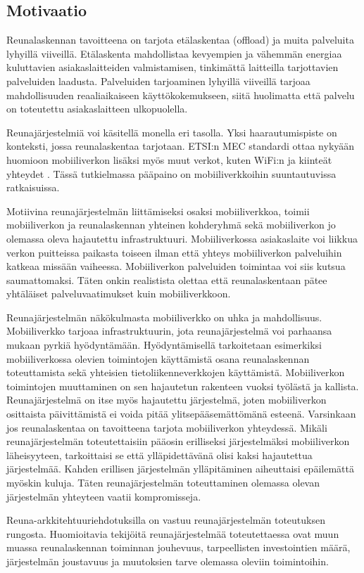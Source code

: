 \subsection{Motivaatio}
Reunalaskennan tavoitteena on tarjota etälaskentaa (offload) ja muita palveluita lyhyillä viiveillä. 
Etälaskenta mahdollistaa kevyempien ja vähemmän energiaa kuluttavien asiakaslaitteiden valmistamisen, tinkimättä laitteilla tarjottavien palveluiden laadusta.
Palveluiden tarjoaminen lyhyillä viiveillä tarjoaa mahdollisuuden reaaliaikaiseen käyttökokemukseen, siitä huolimatta että palvelu on toteutettu asiakaslaitteen ulkopuolella. 

Reunajärjestelmiä voi käsitellä monella eri tasolla. Yksi haarautumispiste on  konteksti, jossa reunalaskentaa tarjotaan. ETSI:n MEC standardi ottaa nykyään huomioon mobiiliverkon lisäksi myös muut verkot, kuten WiFi:n ja kiinteät yhteydet \cite{taleb2017multi}. Tässä tutkielmassa pääpaino on mobiiliverkkoihin suuntautuvissa ratkaisuissa.

Motiivina reunajärjestelmän liittämiseksi osaksi mobiiliverkkoa, toimii mobiiliverkon ja reunalaskennan yhteinen kohderyhmä sekä mobiiliverkon jo olemassa oleva hajautettu infrastruktuuri.
Mobiiliverkossa asiakaslaite voi liikkua verkon puitteissa paikasta toiseen ilman että yhteys mobiiliverkon palveluihin katkeaa missään vaiheessa. Mobiiliverkon palveluiden toimintaa voi siis kutsua saumattomaksi. 
Täten onkin realistista olettaa että reunalaskentaan pätee yhtäläiset palveluvaatimukset kuin mobiiliverkkoon.

Reunajärjestelmän näkökulmasta mobiiliverkko on uhka ja mahdollisuus. Mobiiliverkko tarjoaa infrastruktuurin, jota reunajärjestelmä voi parhaansa mukaan pyrkiä hyödyntämään.
Hyödyntämisellä tarkoitetaan esimerkiksi mobiiliverkossa olevien toimintojen käyttämistä osana reunalaskennan toteuttamista sekä yhteisien tietoliikenneverkkojen käyttämistä.
Mobiiliverkon toimintojen muuttaminen on sen hajautetun rakenteen vuoksi työlästä ja kallista. 
Reunajärjestelmä on itse myös hajautettu järjestelmä, joten mobiiliverkon osittaista päivittämistä ei voida pitää ylitsepääsemättömänä esteenä. Varsinkaan jos reunalaskentaa on tavoitteena tarjota mobiiliverkon yhteydessä. 
Mikäli reunajärjestelmän toteutettaisiin pääosin erilliseksi järjestelmäksi mobiiliverkon läheisyyteen, tarkoittaisi se että ylläpidettävänä olisi kaksi hajautettua järjestelmää. 
Kahden erillisen järjestelmän ylläpitäminen aiheuttaisi epäilemättä myöskin kuluja.
Täten reunajärjestelmän toteuttaminen olemassa olevan järjestelmän yhteyteen vaatii kompromisseja.


Reuna-arkkitehtuuriehdotuksilla on vastuu reunajärjestelmän toteutuksen rungosta.
Huomioitavia tekijöitä reunajärjestelmää toteutettaessa ovat muun muassa reunalaskennan toiminnan jouhevuus, tarpeellisten investointien määrä, järjestelmän joustavuus ja muutoksien tarve olemassa oleviin toimintoihin.

